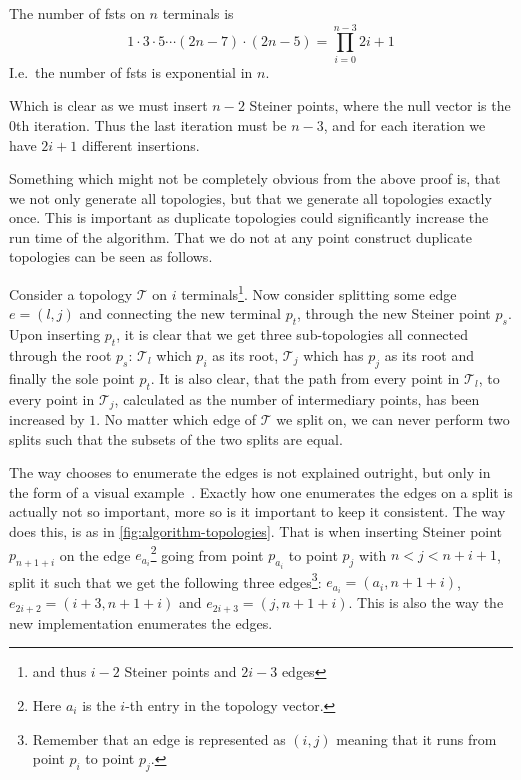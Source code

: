 \begin{corollary}
\label{cor:number-of-fsts}
The number of \acp{fst} on $n$ terminals is
%
\[
  1 \cdot 3 \cdot 5 \cdots (2n - 7) \cdot (2n - 5) = \prod_{i=0}^{n-3} 2i+1
\]
%
I.e.\ the number of \acp{fst} is exponential in $n$.
\end{corollary}

Which is clear as we must insert $n-2$ Steiner points, where the null vector is
the $0$th iteration. Thus the last iteration must be $n-3$, and for each
iteration we have $2i+1$ different insertions.

Something which might not be completely obvious from the above proof is, that we
not only generate all topologies, but that we generate all topologies exactly
once. This is important as duplicate topologies could significantly
increase the run time of the algorithm. That we do not at any point construct
duplicate topologies can be seen as follows.

Consider a topology $\mathcal{T}$ on $i$ terminals\footnote{and thus $i-2$ Steiner
points and $2i-3$ edges}. Now consider splitting some edge $e = (l,j)$ and
connecting the new terminal $p_t$, through the new Steiner point $p_s$. Upon
inserting $p_t$, it is clear that we get three sub-topologies all connected
through the root $p_s$: $\mathcal{T}_l$
which $p_i$ as its root, $\mathcal{T}_j$ which has $p_j$ as its root and finally
the sole point $p_t$. It is also clear, that the path from every point in
$\mathcal{T}_l$, to every point in $\mathcal{T}_j$, calculated as the number of
intermediary points, has been increased by $1$. No matter which edge of
$\mathcal{T}$ we split on, we can never perform two splits such that the subsets
of the two splits are equal.


The way \citeauthor{smith1992} chooses to enumerate the edges is not explained
outright, but only in the form of a visual
example~\cite[p.~143]{smith1992}. Exactly how one enumerates the edges on a
split is actually not so important, more so is it important to keep it
consistent. The way \citeauthor{smith1992} does this, is as in
\cref{fig:algorithm-topologies}. That is when inserting Steiner point
$p_{n+1+i}$ on the edge $e_{a_i}$\footnote{Here $a_i$ is the $i$-th entry in the
  topology vector.} going from point $p_{a_i}$ to point $p_j$ with
$n < j < n+i+1$, split it such that we get the following three
edges\footnote{Remember that an edge is represented as $(i,j)$ meaning that it
  runs from point $p_i$ to point $p_j$.}: $e_{a_{i}} = (a_{i}, n+1+i)$,
$ e_{2i + 2} = (i+3,n+1+i)$ and $ e_{2i + 3} = (j,n+1+i)$. This is also the way
the new implementation enumerates the edges.


